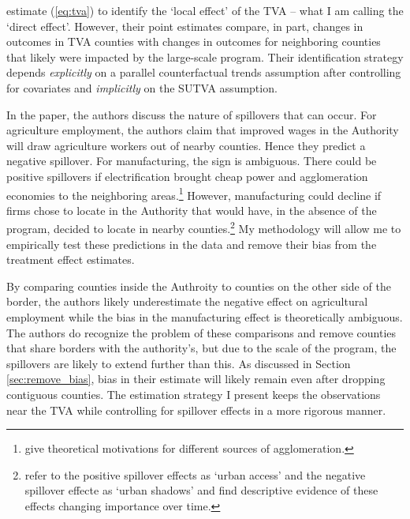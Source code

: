 \documentclass[11pt]{article}
\begin{document}
\citet{Kline_Moretti_2014} estimate (\ref{eq:tva}) to identify the `local effect' of the TVA -- what I am calling the `direct effect'. However, their point estimates compare, in part, changes in outcomes in TVA counties with changes in outcomes for neighboring counties that likely were impacted by the large-scale program. Their identification strategy depends \emph{explicitly} on a parallel counterfactual trends assumption after controlling for covariates and \emph{implicitly} on the SUTVA assumption. 

In the paper, the authors discuss the nature of spillovers that can occur. For agriculture employment, the authors claim that improved wages in the Authority will draw agriculture workers out of nearby counties. Hence they predict a negative spillover. For manufacturing, the sign is ambiguous. There could be positive spillovers if electrification brought cheap power and agglomeration economies to the neighboring areas.\footnote{\citet{Duranton_Puga_2003} give theoretical motivations for different sources of agglomeration.} However, manufacturing could decline if firms chose to locate in the Authority that would have, in the absence of the program, decided to locate in nearby counties.\footnote{\citet{Cuberes_Desmet_Rappaport_2021} refer to the positive spillover effects as `urban access' and the negative spillover effecte as `urban shadows' and find descriptive evidence of these effects changing importance over time.} My methodology will allow me to empirically test these predictions in the data and remove their bias from the treatment effect estimates. 

By comparing counties inside the Authroity to counties on the other side of the border, the authors likely underestimate the negative effect on agricultural employment while the bias in the manufacturing effect is theoretically ambiguous. The authors do recognize the problem of these comparisons and remove counties that share borders with the authority's, but due to the scale of the program, the spillovers are likely to extend further than this. As discussed in Section \ref{sec:remove_bias}, bias in their estimate will likely remain even after dropping contiguous counties. The estimation strategy I present keeps the observations near the TVA while controlling for spillover effects in a more rigorous manner.  
\end{document}
